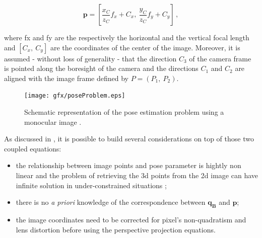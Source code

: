 \begin{equation}
  \mathbf{p} = \left[ \frac{x_C}{z_C} f_x + C_x , \ \frac{y_C}{z_C} f_y + C_y \right] \,,
  \label{eq:p}
\end{equation}

where \gls{fx} and \gls{fy} are the respectively the horizontal and the vertical focal length and $ \left[C_x, \ C_y \right]$ are the coordinates of the center of the image. Moreover, it is assumed - without loss of generality - that the direction $\mathit{C_3}$ of the camera frame is pointed along the boresight of the camera and the directions $\mathit{C_1}$ and $\mathit{C_2}$ are aligned with the image frame defined by $P = \left( \mathit{P_1}, \ \mathit{P_2} \right)$.

\begin{figure}[htbp]
  \centering
  \texttt{[image: gfx/poseProblem.eps]}
  \caption{Schematic representation of the pose estimation problem using a monocular image \cite{Sharma2018}.}
  \label{fig:theposeproblem}
\end{figure}

As discussed in \cite{D2014}, it is possible to build several considerations on top of those two coupled equations:

\begin{itemize}
  \item the relationship between image points and pose parameter is hightly non linear and the problem of retrieving the \acrshort{3d} points from the \acrshort{2d} image can have infinite solution in under-constrained situations \cite{10.1145/358669.358692};
  \item there is no \textit{a priori} knowledge of the correspondence between $\mathbf{q_B}$ and $\mathbf{p}$;
  \item the image coordinates need to be corrected for pixel's non-quadratism and lens distortion before using the perspective projection equations.
\end{itemize}

